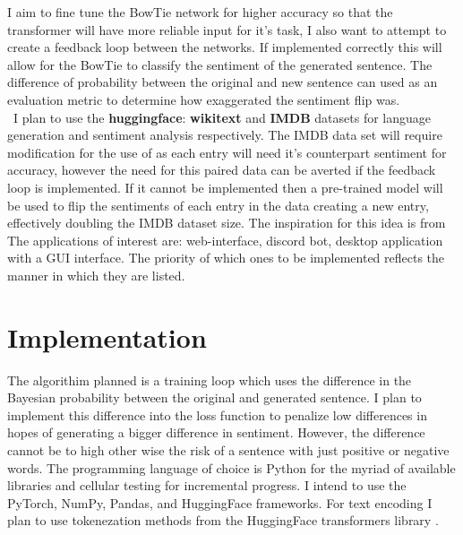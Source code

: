 \documentclass{article}
\begin{document}
	I aim to fine tune the BowTie network for higher accuracy so that the transformer will have more reliable input for it's task, I also want to attempt to create a feedback loop between the networks. If implemented correctly this will allow for the BowTie to classify the sentiment of the generated sentence. The difference of probability between the original and new sentence can used as an evaluation metric to determine how exaggerated the sentiment flip was.\\
	
	\ I plan to use the \textbf{huggingface}: \textbf{wikitext} and \textbf{IMDB} datasets for language generation and sentiment analysis respectively. The IMDB data set will require modification for the use of as each entry will need it's counterpart sentiment for accuracy, however the need for this paired data can be averted if the feedback loop is implemented. If it cannot be implemented then a pre-trained model will be used to flip the sentiments of each entry in the data creating a new entry, effectively doubling the IMDB dataset size. The inspiration for this idea is from \cite{DATA} \\
	
	The applications of interest are: web-interface, discord bot, desktop application with a GUI interface. The priority of which ones to be implemented reflects the manner in which they are listed. 
	
	

\section{Implementation}

	The algorithim planned is a training loop which uses the difference in the Bayesian probability between the original and generated sentence. I plan to implement this difference into the loss function to penalize low differences in hopes of generating a bigger difference in sentiment. However, the difference cannot be to high other wise the risk of a sentence with just positive or negative words. The programming language of choice is Python for the myriad of available libraries and cellular testing for incremental progress. I intend to use the PyTorch, NumPy, Pandas, and HuggingFace frameworks. For text encoding I plan to use tokenezation methods from the HuggingFace transformers library \cite{CM}.
	

\clearpage




\end{document}
